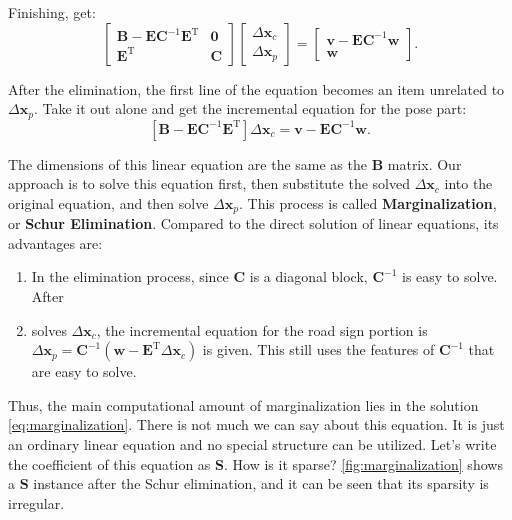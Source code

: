 Finishing, get:
\begin{equation}
\left[ \begin{matrix}
\bm{B} - \bm{E}\bm{C}^{-1}\bm{E}^\mathrm{T}	& 	\bm{0} \\
\bm{E}^\mathrm{T}							& 	\bm{C}
\end{matrix} \right]
\left[ \begin{array}{l}
\Delta \bm{x}_c \\
\Delta \bm{x}_p 
\end{array} \right] = 
\left[\begin{array}{l}
\bm{v} - \bm{E}\bm{C}^{-1}\bm{w}  \\
\bm{w}
\end{array}\right].
\end{equation}

After the elimination, the first line of the equation becomes an item unrelated to $\Delta \bm{x}_p$. Take it out alone and get the incremental equation for the pose part:
\begin{equation}\label{eq:marginalization}
\left[ 
\bm{B} - \bm{E}\bm{C}^{-1}\bm{E}^\mathrm{T}
\right]
\Delta \bm{x}_c  = 
\bm{v} - \bm{E}\bm{C}^{-1}\bm{w} .
\end{equation}

The dimensions of this linear equation are the same as the $\bm{B}$ matrix. Our approach is to solve this equation first, then substitute the solved $\Delta \bm{x}_c$ into the original equation, and then solve $\Delta \bm{x}_p$. This process is called \textbf{Marginalization}\textsuperscript{\cite{Sibley2010}}, or \textbf{Schur Elimination}. Compared to the direct solution of linear equations, its advantages are:

\begin{enumerate}
\item In the elimination process, since $\bm{C}$ is a diagonal block, $\bm{C}^{-1}$ is easy to solve.
After \item solves $\Delta \bm{x}_c$, the incremental equation for the road sign portion is $\Delta \bm{x}_p = \bm{C}^{-1} (\bm{w} - \bm{E}^\mathrm{T} \Delta \bm{x}_c)$ is given. This still uses the features of $\bm{C}^{-1}$ that are easy to solve.
\end{enumerate}

Thus, the main computational amount of marginalization lies in the solution \eqref{eq:marginalization}. There is not much we can say about this equation. It is just an ordinary linear equation and no special structure can be utilized. Let's write the coefficient of this equation as $\bm{S}$. How is it sparse? \autoref{fig:marginalization} shows a $\bm{S}$ instance after the Schur elimination, and it can be seen that its sparsity is irregular.

